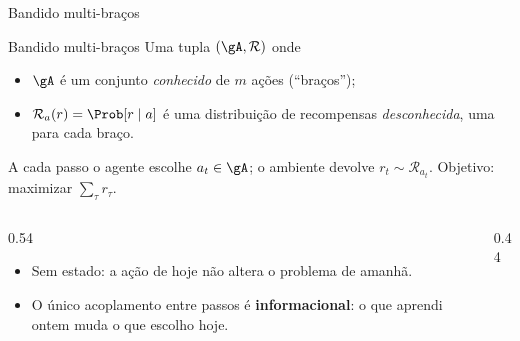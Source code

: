 \documentclass[aspectratio=169, 10pt]{beamer}
\begin{document}
\begin{frame}{Bandido multi-braços}
  \begin{defbox}{Bandido multi-braços}
    Uma tupla $(\gA, \mathcal{R})$ onde
    \begin{itemize}\setlength{\itemsep}{0.2ex}
      \item $\gA$ é um conjunto \emph{conhecido} de $m$ ações (``braços'');
      \item $\mathcal{R}_a(r) = \Prob[r \mid a]$ é uma distribuição de
            recompensas \emph{desconhecida}, uma para cada braço.
    \end{itemize}
    A cada passo o agente escolhe $a_t \in \gA$; o ambiente devolve
    $r_t \sim \mathcal{R}_{a_t}$. Objetivo: maximizar $\sum_{\tau} r_\tau$.
  \end{defbox}

  \vspace{-2mm}
  \begin{columns}[T]
    \begin{column}{0.54\textwidth}
      \begin{itemize}\small
        \item Sem estado: a ação de hoje não altera o problema de amanhã.
        \item O único acoplamento entre passos é \textbf{informacional}:
              o que aprendi ontem muda o que escolho hoje.
      \end{itemize}
    \end{column}
    \begin{column}{0.44\textwidth}
      \centering
    \end{column}
  \end{columns}
\end{frame}
\end{document}
